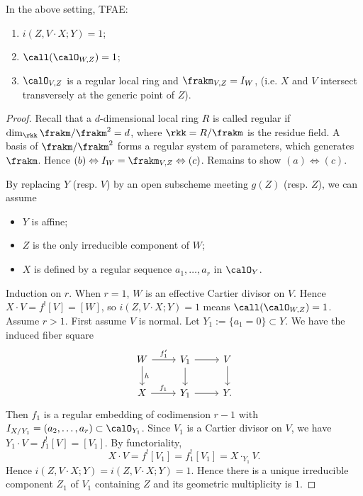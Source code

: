   \begin{proposition}
    In the above setting, TFAE:
    \begin{enumerate}
      \item $i(Z, V \cdot X; Y) = 1$;
      \item $\call(\calO_{W, Z}) = 1$;
      \item $\calO_{V,Z}$ is a regular local ring and $\frakm_{V,Z} = I_W$, (i.e. $X$ and $V$ intersect transversely at the generic point of $Z$).
    \end{enumerate}
  \end{proposition}
  \begin{proof}
    Recall that a $d$-dimensional local ring $R$ is called regular if $\dim_\rkk \frakm/\frakm^2 = d$, where $\rkk = R/\frakm$ is the residue field.
    A basis of $\frakm/\frakm^2$ forms a regular system of parameters, which generates $\frakm$.
    Hence $(b) \Leftrightarrow I_W = \frakm_{V,Z} \Leftrightarrow (c)$.
    Remains to show $(a) \Leftrightarrow (c)$.

    By replacing $Y$ (resp. $V$) by an open subscheme meeting $g(Z)$ (resp. $Z$), we can assume 
    \begin{itemize}
      \item $Y$ is affine;
      \item $Z$ is the only irreducible component of $W$;
      \item $X$ is defined by a regular sequence $a_1, \dots, a_r$ in $\calO_{Y}$.
    \end{itemize}
    Induction on $r$.
    When $r=1$, $W$ is an effective Cartier divisor on $V$.
    Hence $X \cdot V = f^! [V] = [W]$, so $i(Z, V \cdot X; Y) = 1$ means $\call(\calO_{W, Z}) = 1$.
    Assume $r > 1$.
    First assume $V$ is normal.
    Let $Y_1 := \{a_1 = 0\} \subset Y$.
    We have the induced fiber square
    \[
      \begin{tikzcd}
        W \arrow[d, "h"] \arrow[r, "f_1'"] & V_1 \ar[r] \ar[d] & V \arrow[d] \\
        X \arrow[r, "f_1"] & Y_1 \arrow[r] & Y.
      \end{tikzcd}
    \]
    Then $f_1$ is a regular embedding of codimension $r-1$ with $I_{X/Y_1} = (a_2, \dots, a_r) \subset \calO_{Y_1}$.
    Since $V_1$ is a Cartier divisor on $V$, we have $Y_1 \cdot V = f_1^! [V] = [V_1]$.
    By functoriality,
    \[ X \cdot V = f^! [V_1] = f^!_1 [V_1] = X \cdot_{Y_1} V. \]
    Hence $i(Z, V \cdot X; Y) = i(Z, V \cdot X; Y) = 1$.
    Hence there is a unique irreducible component $Z_1$ of $V_1$ containing $Z$ and its geometric multiplicity is $1$.


\end{proof}
